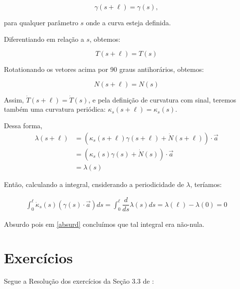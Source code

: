 \documentclass[12pt,letterpaper]{article}
\begin{document}
	$$\gamma(s+\ell)=\gamma(s),$$
	
	para qualquer parâmetro $s$ onde a curva esteja definida.
	
	Diferentiando em relação a $s$, obtemos:
	
	$$T(s+\ell)=T(s)$$
	
	Rotationando os vetores acima por 90 graus antihorários, obtemos:
	
	$$N(s+\ell)=N(s)$$
	
	Assim, $\dot T(s+\ell)=\dot T(s)$, e pela definição de curvatura com sinal, teremos também uma curvatura periódica: 
	$\kappa_s(s+\ell)=\kappa_s(s)$.
	
	Dessa forma, 
	\begin{align*}
		\lambda(s+\ell)&=(\kappa_s(s+\ell)\gamma(s+\ell)+\dot N(s+\ell))\cdotp \vec a\\
		&=(\kappa_s(s)\gamma(s)+\dot N(s))\cdotp \vec a\\
		&=\lambda(s)
	\end{align*}
	
	Então, calculando a integral, cnsiderando a periodicidade de $\lambda$, teríamos:
	
	\begin{align*}
		\int_0^{\ell}\dot \kappa_s(s)(\gamma(s)\cdotp\vec a)ds=\int_0^{\ell}\dfrac{d}{ds}\lambda(s)ds
		=\lambda(\ell)-\lambda(0)=0
	\end{align*}
	
	Absurdo pois em \ref{absurd} concluímos que tal integral era não-nula.
	
	
	\section{Exercícios}
	
	Segue a Resolução dos exercícios da Seção 3.3 de \cite{pressley2001elementary}:
	 
\end{document}
